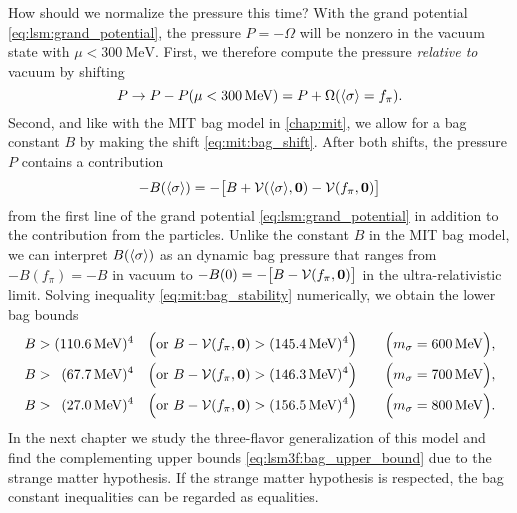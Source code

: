 How should we normalize the pressure this time?
With the grand potential \eqref{eq:lsm:grand_potential},
the pressure $P = - \Omega$ will be nonzero in the vacuum state with $\mu < \SI{300}{\mega\electronvolt}$.
First, we therefore compute the pressure \emph{relative to} vacuum by shifting
\begin{equation}
	P \rightarrow P - P(\mu < \SI{300}{\mega\electronvolt}) = P + \Omega(\langle \sigma \rangle=f_\pi) .
\label{eq:lsm:pressure_bagless}
\end{equation}
Second, and like with the MIT bag model in \cref{chap:mit},
we allow for a bag constant $B$ by making the shift \eqref{eq:mit:bag_shift}.
After both shifts, the pressure $P$ contains a contribution
\begin{equation}
	-B(\langle \sigma \rangle) = -\big[B+\mathcal{V}(\langle \sigma \rangle,{\bm{0}})-\mathcal{V}(f_\pi,{\bm{0}})\big]
\label{eq:lsm:bag_pressure}
\end{equation}
from the first line of the grand potential \eqref{eq:lsm:grand_potential} in addition to the contribution from the particles.
Unlike the constant $B$ in the MIT bag model,
we can interpret $B(\langle \sigma \rangle)$ as an dynamic bag pressure that ranges from $-B(f_\pi)=-B$ in vacuum to $-B(0) = -\big[B-\mathcal{V}(f_\pi,{\bm{0}})\big]$ in the ultra-relativistic limit.
Solving inequality \eqref{eq:mit:bag_stability} numerically, we obtain the lower bag bounds
\begin{subequations}
\begin{align}
	B > (\SI{110.6}{\mega\electronvolt})^4           \quad \Big(\text{or } B-\mathcal{V}(f_\pi,{\bm{0}}) > (\SI{145.4}{\mega\electronvolt})^4\Big) \qquad \Big(m_\sigma = \SI{600}{\mega\electronvolt}\Big), \label{eq:lsm:bag_lower_bound_600} \\
	B > \phantom{0}(\SI{67.7}{\mega\electronvolt})^4 \quad \Big(\text{or } B-\mathcal{V}(f_\pi,{\bm{0}}) > (\SI{146.3}{\mega\electronvolt})^4\Big) \qquad \Big(m_\sigma = \SI{700}{\mega\electronvolt}\Big), \label{eq:lsm:bag_lower_bound_700} \\
	B > \phantom{0}(\SI{27.0}{\mega\electronvolt})^4 \quad \Big(\text{or } B-\mathcal{V}(f_\pi,{\bm{0}}) > (\SI{156.5}{\mega\electronvolt})^4\Big) \qquad \Big(m_\sigma = \SI{800}{\mega\electronvolt}\Big). \label{eq:lsm:bag_lower_bound_800}
\end{align}%
\label{eq:lsm:bag_lower_bound}%
\end{subequations}%
In the next chapter we study the three-flavor generalization of this model and find the complementing upper bounds \eqref{eq:lsm3f:bag_upper_bound} due to the strange matter hypothesis.
If the strange matter hypothesis is respected, the bag constant inequalities can be regarded as equalities.

